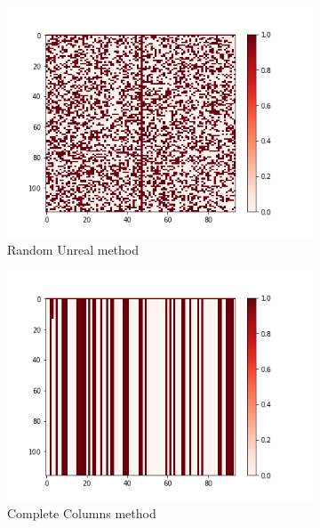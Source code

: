 \documentclass[10pt, conference, compsocconf]{IEEEtran}
\begin{document}
\begin{figure}[h!]
	\centering
	\begin{subfigure}[b]{0.6\linewidth}
		\includegraphics[width=\columnwidth]{figures/5vs7_random-unreal_04_training}
  		\caption{Random Unreal method}
  		\label{fig:Random-Unreal-Sample-Training-set}
	\end{subfigure}
	\begin{subfigure}[b]{0.4\linewidth}
  		\includegraphics[width=\columnwidth]{figures/5vs7_columns_04_training}
  		\caption{Complete Columns method}
  		\label{fig:Columns-Sample-Training-set}
	\end{subfigure}
	\begin{subfigure}[b]{0.4\linewidth}

\end{subfigure}
\end{figure}
\end{document}
